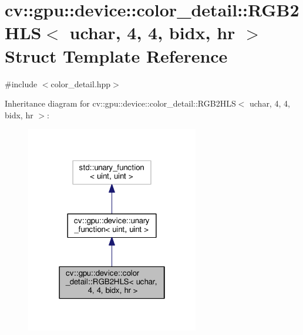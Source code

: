 \hypertarget{structcv_1_1gpu_1_1device_1_1color__detail_1_1RGB2HLS_3_01uchar_00_014_00_014_00_01bidx_00_01hr_01_4}{\section{cv\-:\-:gpu\-:\-:device\-:\-:color\-\_\-detail\-:\-:R\-G\-B2\-H\-L\-S$<$ uchar, 4, 4, bidx, hr $>$ Struct Template Reference}
\label{structcv_1_1gpu_1_1device_1_1color__detail_1_1RGB2HLS_3_01uchar_00_014_00_014_00_01bidx_00_01hr_01_4}
}


{\ttfamily \#include $<$color\-\_\-detail.\-hpp$>$}



Inheritance diagram for cv\-:\-:gpu\-:\-:device\-:\-:color\-\_\-detail\-:\-:R\-G\-B2\-H\-L\-S$<$ uchar, 4, 4, bidx, hr $>$\-:\nopagebreak
\begin{figure}[H]
\begin{center}
\leavevmode
\includegraphics[width=214pt]{structcv_1_1gpu_1_1device_1_1color__detail_1_1RGB2HLS_3_01uchar_00_014_00_014_00_01bidx_00_01hr_01_4__inherit__graph}
\end{center}
\end{figure}


